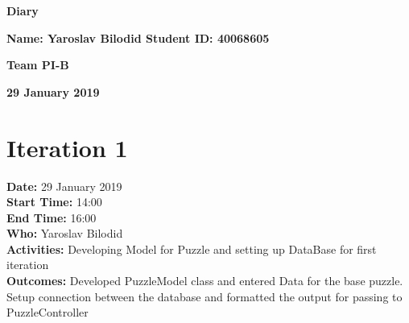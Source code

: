\documentclass[12pt]{article}
\begin{document}
\vspace*{0.2in}
\centerline{\bf\Large Diary}

\vspace*{0.2in}
\centerline{\bf\Large Name: Yaroslav Bilodid   Student ID: 40068605}

\vspace*{0.2in}
\centerline{\bf\Large Team PI-B}

\vspace*{0.2in}
\centerline{\bf\Large 29 January 2019}

\section{Iteration 1}

{\bf Date:} 29 January 2019\\
{\bf Start Time:} 14:00\\
{\bf End Time:} 16:00 \\
{\bf Who:} Yaroslav Bilodid \\
{\bf Activities:} Developing Model for Puzzle and setting up DataBase for first iteration\\
{\bf Outcomes:} Developed PuzzleModel class and entered Data for the base puzzle. Setup connection between the database and formatted the output for passing to PuzzleController\\


\end{document}
